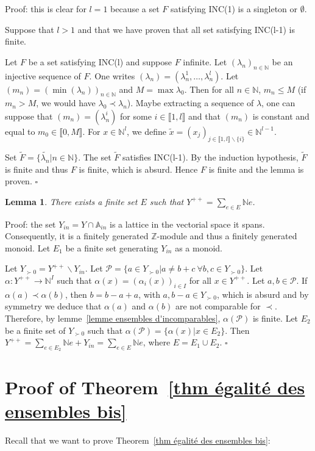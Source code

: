 \documentclass[12pt]{article}
\theoremstyle{plain}
\newtheorem{lemme}[thm]{Lemma}
\theoremstyle{definition}
\newcommand{\A}{\mathbb{A}}
\newcommand{\N}{\mathbb{N}}
\newcommand{\Z}{\mathbb{Z}}
\begin{document}
Proof: this  is clear for $l=1$ because a set $F$ satisfying INC(1) is a singleton or $\emptyset$. 

Suppose that $l>1$ and that we have proven that all set satisfying INC(l-1) is finite.

Let $F$ be a set  satisfying INC(l) and suppose $F$ infinite. Let $(\lambda_n)_{n\in \N}$ be an injective sequence of $F$. One writes $(\lambda_n)=(\lambda_n^1,\ldots,\lambda_n^l)$. Let $(m_n)=(\min(\lambda_n))_{n\in \N}$ and $M=\max \lambda_{0}$. Then for all $n\in \N$, $m_n\leq M$ (if $m_n>M$, we would have $\lambda_{0}\prec \lambda_n$). Maybe extracting a sequence of $\lambda$, one can suppose that $(m_n)=(\lambda_n^i)$ for some $i\in \llbracket 1, l\rrbracket$ and that $(m_n)$ is constant and equal to $m_0\in \llbracket 0,M\rrbracket$. For $x\in \N^l$, we define $\tilde{x}=(x_j)_{j\in \llbracket 1,l\rrbracket\backslash \{i\}}\in \N^{l-1}$. 
 
 Set $\tilde{F}=\{\tilde{\lambda_n}|n\in\N\}$. The set $\tilde{F}$ satisfies INC(l-1). By the induction hypothesis, $\tilde{F}$ is finite and thus $F$ is finite, which is absurd. Hence $F$ is finite and the lemma is proven. $\square$

\begin{lemme}\label{lemme description de Y^{++}}
There exists a finite set $E$ such that $Y^{++}=\sum_{e\in E}\N e$.
\end{lemme}

Proof: the set $Y_{in}=Y\cap\A_{in}$ is a lattice in the vectorial space it spans. Consequently, it is a finitely generated $\Z$-module and thus a finitely generated monoid. Let $E_1$ be a finite set generating $Y_{in}$ as a monoid.

 Let $Y_{\succ 0}=Y^{++}\backslash Y_{in}$. Let $\mathcal{P}=\{a\in Y_{\succ 0}|a\neq b+c\ \forall b,c\in Y_{\succ 0}\}$. Let $\alpha:Y^{++}\rightarrow \N^{I}$ such that 
 $\alpha(x)=(\alpha_i(x))_{i\in I}$ for all $x\in Y^{++}$. Let $a,b\in \mathcal{P}$.
  If $\alpha(a)\prec \alpha(b)$, then $b=b-a+a$, with $a,b-a\in Y_{\succ 0}$, which is absurd and by symmetry we deduce that $\alpha(a)$ and $\alpha(b)$ are not comparable for $\prec$. 
Therefore, by lemme~\ref{lemme ensembles d'incomparables}, $\alpha(\mathcal{P})$ is finite. Let $E_2$ be a finite set of $Y_{\succ 0}$ such that $\alpha(\mathcal{P})=\{\alpha(x)|x\in E_2\}$. Then $Y^{++}=\sum_{e\in E_2}\N e+Y_{in}=\sum_{e\in E}\N e$, where $E=E_1\cup E_2$. $\square$

 

\section{Proof of Theorem~\ref{thm égalité des ensembles bis}}\label{sect proof of final theorem}
Recall that we want to prove Theorem~\ref{thm égalité des ensembles bis}: 
\end{document}
